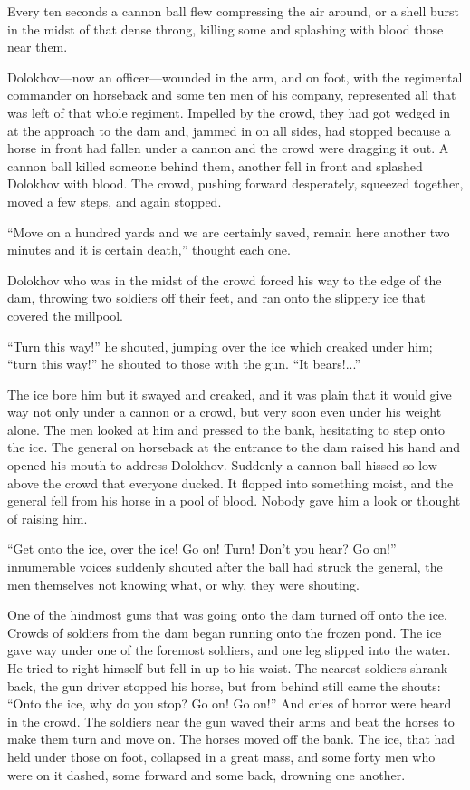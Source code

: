 Every ten seconds a cannon ball flew compressing the air around,
or a shell burst in the midst of that dense throng, killing some
and splashing with blood those near them.

Dolokhov---now an officer---wounded in the arm, and on foot, with
the regimental commander on horseback and some ten men of his
company, represented all that was left of that whole
regiment. Impelled by the crowd, they had got wedged in at the
approach to the dam and, jammed in on all sides, had stopped
because a horse in front had fallen under a cannon and the crowd
were dragging it out. A cannon ball killed someone behind them,
another fell in front and splashed Dolokhov with blood. The
crowd, pushing forward desperately, squeezed together, moved a
few steps, and again stopped.

``Move on a hundred yards and we are certainly saved, remain here
another two minutes and it is certain death,'' thought each one.

Dolokhov who was in the midst of the crowd forced his way to the
edge of the dam, throwing two soldiers off their feet, and ran
onto the slippery ice that covered the millpool.

``Turn this way!'' he shouted, jumping over the ice which creaked
under him; ``turn this way!'' he shouted to those with the
gun. ``It bears!...''

The ice bore him but it swayed and creaked, and it was plain that
it would give way not only under a cannon or a crowd, but very
soon even under his weight alone. The men looked at him and
pressed to the bank, hesitating to step onto the ice. The general
on horseback at the entrance to the dam raised his hand and
opened his mouth to address Dolokhov. Suddenly a cannon ball
hissed so low above the crowd that everyone ducked. It flopped
into something moist, and the general fell from his horse in a
pool of blood. Nobody gave him a look or thought of raising him.

``Get onto the ice, over the ice! Go on! Turn! Don't you hear? Go
on!''  innumerable voices suddenly shouted after the ball had
struck the general, the men themselves not knowing what, or why,
they were shouting.

One of the hindmost guns that was going onto the dam turned off
onto the ice. Crowds of soldiers from the dam began running onto
the frozen pond.  The ice gave way under one of the foremost
soldiers, and one leg slipped into the water. He tried to right
himself but fell in up to his waist.  The nearest soldiers shrank
back, the gun driver stopped his horse, but from behind still
came the shouts: ``Onto the ice, why do you stop? Go on! Go on!''
And cries of horror were heard in the crowd. The soldiers near
the gun waved their arms and beat the horses to make them turn
and move on. The horses moved off the bank. The ice, that had
held under those on foot, collapsed in a great mass, and some
forty men who were on it dashed, some forward and some back,
drowning one another.

